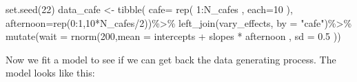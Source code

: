 \documentclass[
]{book}
\newenvironment{Shaded}{\begin{snugshade}}{\end{snugshade}}
\newcommand{\AttributeTok}[1]{\textcolor[rgb]{0.77,0.63,0.00}{#1}}
\newcommand{\DecValTok}[1]{\textcolor[rgb]{0.00,0.00,0.81}{#1}}
\newcommand{\FloatTok}[1]{\textcolor[rgb]{0.00,0.00,0.81}{#1}}
\newcommand{\FunctionTok}[1]{\textcolor[rgb]{0.00,0.00,0.00}{#1}}
\newcommand{\NormalTok}[1]{#1}
\newcommand{\OtherTok}[1]{\textcolor[rgb]{0.56,0.35,0.01}{#1}}
\newcommand{\SpecialCharTok}[1]{\textcolor[rgb]{0.00,0.00,0.00}{#1}}
\newcommand{\StringTok}[1]{\textcolor[rgb]{0.31,0.60,0.02}{#1}}
\begin{document}
\begin{Shaded}
\begin{Highlighting}[]
\FunctionTok{set.seed}\NormalTok{(}\DecValTok{22}\NormalTok{) }
\NormalTok{data\_cafe }\OtherTok{\textless{}{-}} \FunctionTok{tibble}\NormalTok{( }\AttributeTok{cafe=} \FunctionTok{rep}\NormalTok{( }\DecValTok{1}\SpecialCharTok{:}\NormalTok{N\_cafes , }\AttributeTok{each=}\DecValTok{10}\NormalTok{ ), }
                     \AttributeTok{afternoon=}\FunctionTok{rep}\NormalTok{(}\DecValTok{0}\SpecialCharTok{:}\DecValTok{1}\NormalTok{,}\DecValTok{10}\SpecialCharTok{*}\NormalTok{N\_cafes}\SpecialCharTok{/}\DecValTok{2}\NormalTok{))}\SpecialCharTok{\%\textgreater{}\%}
  \FunctionTok{left\_join}\NormalTok{(vary\_effects, }\AttributeTok{by =} \StringTok{"cafe"}\NormalTok{)}\SpecialCharTok{\%\textgreater{}\%}
  \FunctionTok{mutate}\NormalTok{(}\AttributeTok{wait =} \FunctionTok{rnorm}\NormalTok{(}\DecValTok{200}\NormalTok{,}\AttributeTok{mean  =}\NormalTok{ intercepts }\SpecialCharTok{+}\NormalTok{ slopes }\SpecialCharTok{*}\NormalTok{ afternoon , }\AttributeTok{sd =} \FloatTok{0.5}\NormalTok{ ))}
\end{Highlighting}
\end{Shaded}

Now we fit a model to see if we can get back the data generating process. The model looks like this:
\end{document}
